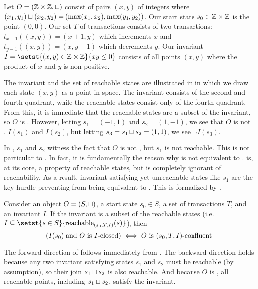 {}

\begin{example}
  Let $O = (\mathbb{Z} \times \mathbb{Z}, \sqcup)$ consist of pairs $(x, y)$ of integers
  where $(x_1, y_1) \sqcup (x_2, y_2) = (\max(x_1, x_2), \max(y_1, y_2))$. Our
  start state $s_0 \in \mathbb{Z} \times \mathbb{Z}$ is the point $(0, 0)$. Our set $T$
  of transactions consists of two transactions: $t_{x+1}((x, y)) = (x + 1, y)$
  which increments $x$ and $t_{y-1}((x, y)) = (x, y - 1)$ which decrements $y$.
  Our invariant $I = \setst{(x, y) \in \ints \times \ints}{xy \leq 0}$ consists
  of all points $(x, y)$ where the product of $x$ and $y$ is non-positive.

  The invariant and the set of reachable states are illustrated in 
  in which we draw each state $(x, y)$ as a point in space. The invariant
  consists of the second and fourth quadrant, while the reachable states consist only
  of the fourth quadrant. From this, it is immediate that the reachable states
  are a subset of the invariant, so $O$ is \invariantconfluent{}. However,
  letting $s_1 = (-1, 1)$ and $s_2 = (1, -1)$, we see that $O$ is not
  \invariantclosed{}. $I(s_1)$ and $I(s_2)$, but letting $s_3 = s_1 \sqcup s_2 =
  (1, 1)$, we see $\lnot I(s_3)$.
\end{example}

In , $s_1$ and $s_2$ witness the fact that $O$ is not
\invariantclosed{}, but $s_1$ is not reachable. This is not particular to
. In fact, it is fundamentally the reason why
\invariantclosure{} is not equivalent to \invariantconfluence{}.
\Invariantconfluence{} is, at its core, a property of reachable states, but
\invariantclosure{} is completely ignorant of reachability. As a result,
invariant-satisfying yet unreachable states like $s_1$ are the key hurdle
preventing \invariantclosure{} from being equivalent to \invariantconfluence{}.
This is formalized by .

\begin{theorem}
  Consider an object $O = (S, \sqcup)$, a start state $s_0 \in S$, a set of
  transactions $T$, and an invariant $I$. If the invariant is a subset of the
  reachable states (i.e. $I \subseteq \setst{s \in
  S}{\sTIreachablepredicate{s}}$), then
  \[
    (\text{$I(s_0)$ and $O$ is $I$-closed{}}) \iff \text{$O$ is $(s_0, T, I)$-confluent{}}
  \]
\end{theorem}

The forward direction of  follows
immediately from . The backward direction
holds because any two invariant satisfying states $s_1$ and $s_2$ must be
reachable (by assumption), so their join $s_1 \sqcup s_2$ is also reachable.
And because $O$ is \sTIconfluent{}, all reachable points, including $s_1
\sqcup s_2$, satisfy the invariant.
